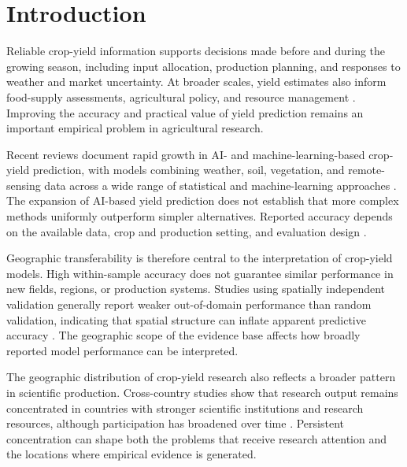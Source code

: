 \documentclass[ASNA,twocolumn]{USG}
\begin{document}


\maketitle

\section{Introduction}\label{sec:intro}


Reliable crop-yield information supports decisions made before and during the growing season,
including input allocation, production planning, and responses to weather and market
uncertainty. At broader scales, yield estimates also inform food-supply assessments,
agricultural policy, and resource management \cite{vanKlompenburg2020}. Improving the accuracy
and practical value of yield prediction remains an important empirical problem in
agricultural research.

Recent reviews document rapid growth in AI- and machine-learning-based crop-yield prediction,
with models combining weather, soil, vegetation, and remote-sensing data across a wide range of
statistical and machine-learning approaches \cite{Shawon2025,vanKlompenburg2020}. The expansion
of AI-based yield prediction does not establish that more complex methods uniformly outperform
simpler alternatives. Reported accuracy depends on the available data, crop and production setting,
and evaluation design \cite{Jabed2024}.

Geographic transferability is therefore central to the interpretation of crop-yield models.
High within-sample accuracy does not guarantee similar performance in new fields, regions, or
production systems. Studies using spatially independent validation generally report weaker
out-of-domain performance than random validation, indicating that spatial structure can
inflate apparent predictive accuracy \cite{Habibi2024,Okupska2026,Stiller2024}. The geographic scope of the evidence base affects how broadly reported model
performance can be interpreted.

The geographic distribution of crop-yield research also reflects a broader pattern in
scientific production. Cross-country studies show that research output remains concentrated
in countries with stronger scientific institutions and research resources, although
participation has broadened over time \cite{Bueno2025,CashGibson2018}. Persistent
concentration can shape both the problems that receive research attention and the locations
where empirical evidence is generated.
\end{document}

